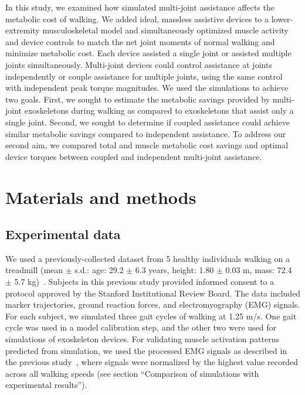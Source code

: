 \documentclass[10pt,letterpaper]{article}
\begin{document}
In this study, we examined how simulated multi-joint assistance affects the metabolic cost of walking. We added ideal, massless assistive devices to a lower-extremity musculoskeletal model and simultaneously optimized muscle activity and device controls to match the net joint moments of normal walking and minimize metabolic cost. Each device assisted a single joint or assisted multiple joints simultaneously. Multi-joint devices could control assistance at joints independently or couple assistance for multiple joints, using the same control with independent peak torque magnitudes. We used the simulations to achieve two goals. First, we sought to estimate the metabolic savings provided by multi-joint exoskeletons during walking as compared to exoskeletons that assist only a single joint. Second, we sought to determine if coupled assistance could achieve similar metabolic savings compared to independent assistance. To address our second aim, we compared total and muscle metabolic cost savings and optimal device torques between coupled and independent multi-joint assistance.

\section*{Materials and methods}

\subsection*{Experimental data}
We used a previously-collected dataset from 5 healthy individuals walking on a treadmill (mean $\pm$ s.d.: age: 29.2 $\pm$ 6.3 years, height: 1.80 $\pm$ 0.03 m, mass: 72.4 $\pm$ 5.7 kg)~\cite{Arnold:2013}. Subjects in this previous study provided informed consent to a protocol approved by the Stanford Institutional Review Board. The data included marker trajectories, ground reaction forces, and electromyography (EMG) signals. For each subject, we simulated three gait cycles of walking at 1.25 m/s. One gait cycle was used in a model calibration step, and the other two were used for simulations of exoskeleton devices. For validating muscle activation patterns predicted from simulation, we used the processed EMG signals as described in the previous study~\cite{Arnold:2013}, where signals were normalized by the highest value recorded across all walking speeds (see section ``Comparison of simulations with experimental results''). 
\end{document}
